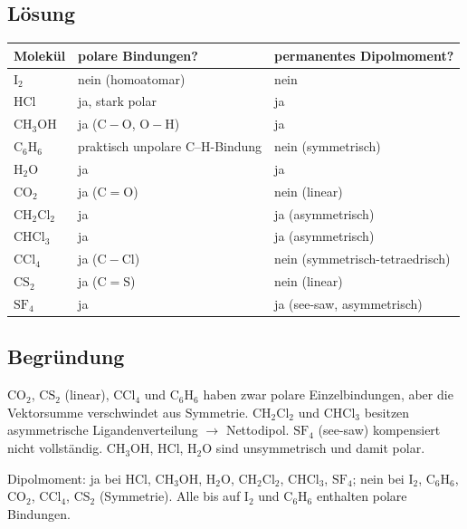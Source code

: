 
\subsection*{Lösung}
\begin{center}
\begin{tabular}{@{}l l l@{}}
  Molekül & polare Bindungen? & permanentes Dipolmoment? \\
  \hline
  $\mathrm{I_2}$      & nein (homoatomar)  & nein \\
  $\mathrm{HCl}$      & ja, stark polar     & ja \\
  $\mathrm{CH_3OH}$   & ja ($\mathrm{C-O}$, $\mathrm{O-H}$) & ja \\
  $\mathrm{C_6H_6}$   & praktisch unpolare C--H-Bindung & nein (symmetrisch)
  \\
  $\mathrm{H_2O}$     & ja                  & ja \\
  $\mathrm{CO_2}$     & ja ($\mathrm{C=O}$)& nein (linear) \\
  $\mathrm{CH_2Cl_2}$ & ja                  & ja (asymmetrisch) \\
  $\mathrm{CHCl_3}$   & ja                  & ja (asymmetrisch) \\
  $\mathrm{CCl_4}$    & ja ($\mathrm{C-Cl}$)& nein (symmetrisch-tetraedrisch) \\
  $\mathrm{CS_2}$     & ja ($\mathrm{C=S}$)& nein (linear) \\
  $\mathrm{SF_4}$     & ja                  & ja (see-saw, asymmetrisch) \\
\end{tabular}
\end{center}

\subsection*{Begründung}
$\mathrm{CO_2}$, $\mathrm{CS_2}$ (linear), $\mathrm{CCl_4}$ und $\mathrm{C_6H_6}$
haben zwar polare Einzelbindungen, aber die Vektorsumme verschwindet aus
Symmetrie. $\mathrm{CH_2Cl_2}$ und $\mathrm{CHCl_3}$ besitzen asymmetrische
Ligandenverteilung $\to$ Nettodipol. $\mathrm{SF_4}$ (see-saw) kompensiert
nicht vollständig. $\mathrm{CH_3OH}$, $\mathrm{HCl}$, $\mathrm{H_2O}$
sind unsymmetrisch und damit polar.

\begin{ergebnis}
Dipolmoment: ja bei $\mathrm{HCl}$, $\mathrm{CH_3OH}$, $\mathrm{H_2O}$,
$\mathrm{CH_2Cl_2}$, $\mathrm{CHCl_3}$, $\mathrm{SF_4}$; nein bei
$\mathrm{I_2}$, $\mathrm{C_6H_6}$, $\mathrm{CO_2}$, $\mathrm{CCl_4}$,
$\mathrm{CS_2}$ (Symmetrie). Alle bis auf $\mathrm{I_2}$ und
$\mathrm{C_6H_6}$ enthalten polare Bindungen.
\end{ergebnis}

